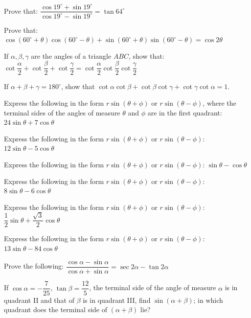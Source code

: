 \documentclass[11pt,a4paper]{article}
\begin{document}
\begin{longlist}
\item Prove that: $\dfrac{\cos19^\circ+\sin19^\circ}{\cos19^\circ-\sin19^\circ}=\tan64^\circ$

\item Prove that: $\cos(60^\circ+\theta)\cos(60^\circ-\theta)+\sin(60^\circ+\theta)\sin(60^\circ-\theta)=\cos2\theta$

\item If $\alpha,\beta,\gamma$ are the angles of a triangle $ABC$, show that: $\cot\dfrac{\alpha}{2}+\cot\dfrac{\beta}{2}+\cot\dfrac{\gamma}{2}=\cot\dfrac{\alpha}{2}\cot\dfrac{\beta}{2}\cot\dfrac{\gamma}{2}$

\item If $\alpha+\beta+\gamma=180^\circ$, show that $\cot\alpha\cot\beta+\cot\beta\cot\gamma+\cot\gamma\cot\alpha=1$.

\item Express the following in the form $r\sin(\theta+\phi)$ or $r\sin(\theta-\phi)$, where the terminal sides of the angles of measure $\theta$ and $\phi$ are in the first quadrant: $24\sin\theta+7\cos\theta$

\item Express the following in the form $r\sin(\theta+\phi)$ or $r\sin(\theta-\phi)$: $12\sin\theta-5\cos\theta$

\item Express the following in the form $r\sin(\theta+\phi)$ or $r\sin(\theta-\phi)$: $\sin\theta-\cos\theta$

\item Express the following in the form $r\sin(\theta+\phi)$ or $r\sin(\theta-\phi)$: $8\sin\theta-6\cos\theta$

\item Express the following in the form $r\sin(\theta+\phi)$ or $r\sin(\theta-\phi)$: $\dfrac{1}{2}\sin\theta+\dfrac{\sqrt{3}}{2}\cos\theta$

\item Express the following in the form $r\sin(\theta+\phi)$ or $r\sin(\theta-\phi)$: $13\sin\theta-84\cos\theta$

\item Prove the following: $\dfrac{\cos\alpha-\sin\alpha}{\cos\alpha+\sin\alpha}=\sec2\alpha-\tan2\alpha$

\item If $\cos\alpha=-\dfrac{7}{25}$, $\tan\beta=\dfrac{12}{5}$, the terminal side of the angle of measure $\alpha$ is in quadrant II and that of $\beta$ is in quadrant III, find $\sin(\alpha+\beta)$; in which quadrant does the terminal side of $(\alpha+\beta)$ lie?


\end{longlist}
\end{document}
